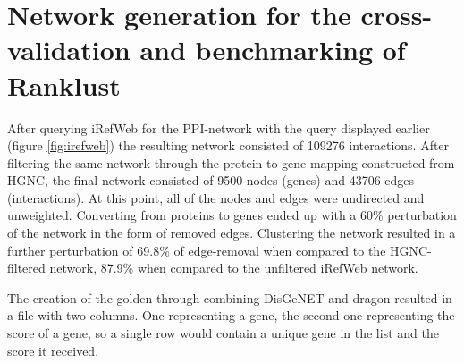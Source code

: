 \section{Network generation for the cross-validation and benchmarking of Ranklust}
After querying iRefWeb for the PPI-network with the query displayed earlier
(figure \ref{fig:irefweb}) the resulting network consisted of 109276 interactions.
After filtering the same network through the protein-to-gene mapping constructed
from HGNC, the final network consisted of 9500 nodes (genes) and 43706 edges
(interactions). At this point, all of the nodes and edges were undirected and
unweighted. Converting from proteins to genes ended up with a 60\% perturbation
of the network in the form of removed edges. Clustering the network resulted in
a further perturbation of 69.8\% of edge-removal when compared to the
HGNC-filtered network, 87.9\% when compared to the unfiltered iRefWeb network.

The creation of the \gls{golden} through combining DisGeNET and \gls{dragon}
resulted in a file with two columns. One representing a gene, the second one
representing the score of a gene, so a single row would contain a unique gene in
the list and the score it received.

